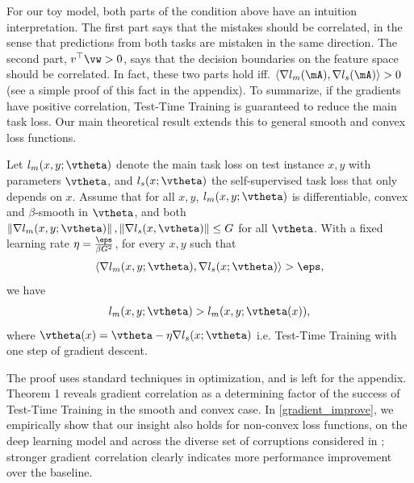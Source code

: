 For our toy model, both parts of the condition above have an intuition interpretation.
The first part says that the mistakes should be correlated, in the sense
that predictions from both tasks are mistaken in the same direction. The second
part, $v^\top \vw > 0$, says that the decision boundaries on the feature
space should be correlated. In fact, these two parts hold iff.
$\langle \grad l_m(\mA), \grad l_s(\mA)\rangle > 0$ 
(see a simple proof of this fact in the appendix). To summarize, if the gradients have
positive correlation, Test-Time Training is guaranteed to reduce the main task loss.
Our main theoretical result extends this to general smooth and convex loss functions.

\newpage
{\theorem	\label{main_theorem}
Let $l_m(x, y; \vtheta)$ denote the main task loss on test instance $x, y$ with
parameters $\vtheta$, and $l_s(x; \vtheta)$ the self-supervised task loss that only depends on $x$.
Assume that for all $x, y$,
$l_m(x, y; \vtheta)$ is differentiable, convex and $\beta$-smooth
in $\vtheta$,
and both
$\norm{\grad l_m(x, y; \vtheta)}, \norm{\grad l_s(x, \vtheta)} \leq G$ 
for all $\vtheta$.
With a fixed learning rate $\eta = \frac{\eps}{\beta G^2}$, 
for every $x, y$ such that 
\begin{align}
\langle \grad l_m(x, y; \vtheta), \grad l_s(x; \vtheta) \rangle  > \eps,
\end{align}
we have
\begin{align}
l_m(x, y; \vtheta)
>  l_m(x, y; \vtheta(x)),
\end{align}
where $\vtheta(x) = \vtheta - \eta \grad l_s(x; \vtheta)$ i.e. Test-Time Training with one step of gradient descent.
}

The proof uses standard techniques in optimization, and is left for
the appendix.  Theorem 1 reveals gradient correlation as a determining factor of the success of Test-Time Training in the smooth and convex case.
In \autoref{gradient_improve}, we empirically show that our insight also holds for non-convex loss functions,
on the deep learning model and across the diverse set of corruptions considered in ; stronger gradient correlation clearly indicates more performance improvement over the baseline.
